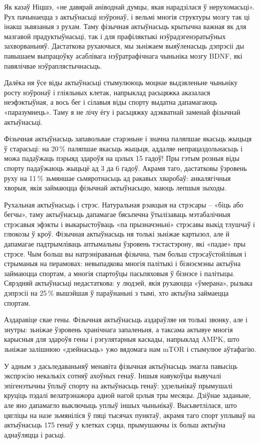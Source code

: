 Як казаў Ніцшэ, «не давярай аніводнай думцы, якая нарадзілася ў нерухомасьці». Рух пачынаецца з актыўнасьці нэўронаў, і вельмі многія структуры мозгу так ці інакш зьвязаныя з рухам. Таму фізычная актыўнасьць крытычна важная як для мазгавой прадуктыўнасьці, так і для прафіляктыкі нэўрадэгенэратыўных захворваньняў. Дастаткова рухаючыся, мы зьніжаем выяўленасьць дэпрэсіі ды павышаем выпрацоўку асаблівага нэўратрафічнага чыньніка мозгу BDNF, які павялічвае нэўраплястычнасьць.

Далёка ня ўсе віды актыўнасьці стымулююць моцнае выдзяленьне чыньніку росту нэўронаў і гліяльных клетак, напрыклад расьцяжка аказалася неэфэктыўная, а вось бег і сілавыя віды спорту выдатна дапамагаюць «паразумнець». Таму я не лічу ёгу і расьцяжку адэкватнай заменай фізычнай актыўнасьці.

Фізычная актыўнасьць запавольвае старэньне і значна паляпшае якасьць жыцьця ў старасьці: на 20\,\% паляпшае якасьць жыцьця, аддаляе непрацаздольнасьць і можа падаўжаць пэрыяд здароўя на цэлых 15 гадоў! Пры гэтым розныя віды спорту падаўжаюць жыцьцё ад 3 да 6 гадоў. Акрамя таго, дастатковы ўзровень руху на 11\,\% зьмяншае сьмяротнасьць ад ракавых хваробаў: анкалягічныя хворыя, якія займаюцца фізычнай актыўнасьцю, маюць лепшыя зыходы.

Рухальная актыўнасьць і стрэс. Натуральная рэакцыя на стрэсары – «біць або бегчы», таму актыўнасьць дапамагае бясьпечна ўтылізаваць мэтабалічныя стрэсавыя эфэкты і выкарыстоўваць «па прызначэньні» стрэсавы выкід тлушчаў і глюкозы ў кроў. Фізычная актыўнасьць ня толькі зьніжае картызол, але й дапамагае падтрымліваць аптымальны ўзровень тэстастэрону, які «падае» пры стрэсе. Чым больш вы натрэніраваныя фізычна, тым больш стрэсаўстойлівыя і стрыманыя на перамовах: невыпадкова многія палітыкі і бізнэсмэны актыўна займаюцца спортам, а многія спартоўцы пасьпяховыя ў бізнэсе і палітыцы. Сярэдняй актыўнасьці недастаткова: у людзей, якія рухаюцца «ўмерана», рызыка дэпрэсіі на 25\,\% вышэйшая ў параўнаньні з тымі, хто актыўна займаецца спортам.

Аздаравіце свае гены. Фізычная актыўнасьць аздараўляе ня толькі звонку, але і знутры: зьніжае ўзровень хранічнага запаленьня, а таксама актывуе многія карысныя для здароўя гены і рэгулятарныя каскады, напрыклад AMPK, што зьніжае залішнюю «дзейнасьць» ужо вядомага нам mTOR і стымулюе аўтафагію.

У адным з дасьледаваньняў менавіта фізычная актыўнасьць змагла павысіць экспрэсію некалькіх сотняў ахоўных генаў. Іншыя навукоўцы вывучалі эпігенэтычны ўплыў спорту на актыўнасьць генаў: удзельнікаў прымушалі круціць пэдалі велатрэнажора адной нагой цэлыя тры месяцы. Дзіўнае заданьне, але яно дапамагло выключыць уплыў іншых чыньнікаў. Высьветлілася, што цягліцы на назе зьмяніліся ў пяці тысячах пунктаў, акрамя таго спорт уплываў на актыўнасьць 175 генаў у клетках сэрца, прымушаючы іх больш актыўна аднаўляцца і расьці.

